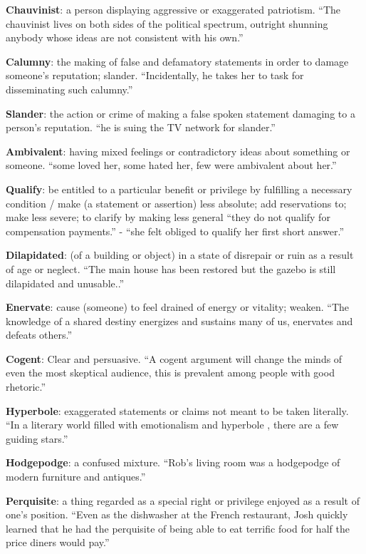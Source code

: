 \documentclass[12pt, a4paper]{ximera}
\begin{document}
\textbf{Chauvinist}: a person displaying aggressive or exaggerated patriotism. ``The chauvinist lives on both sides of the political spectrum, outright shunning anybody whose ideas are not consistent with his own.''

\textbf{Calumny}: the making of false and defamatory statements in order to damage someone's reputation; slander. ``Incidentally, he takes her to task for disseminating such calumny.''

\textbf{Slander}: the action or crime of making a false spoken statement damaging to a person's reputation. ``he is suing the TV network for slander.''

\textbf{Ambivalent}: having mixed feelings or contradictory ideas about something or someone. ``some loved her, some hated her, few were ambivalent about her.''

\textbf{Qualify}: be entitled to a particular benefit or privilege by fulfilling a necessary condition / make (a statement or assertion) less absolute; add reservations to; make less severe; to clarify by making less general ``they do not qualify for compensation payments.'' - ``she felt obliged to qualify her first short answer.''

\textbf{Dilapidated}: (of a building or object) in a state of disrepair or ruin as a result of age or neglect. ``The main house has been restored but the gazebo is still dilapidated and unusable..''

\textbf{Enervate}: cause (someone) to feel drained of energy or vitality; weaken.  ``The knowledge of a shared destiny energizes and sustains many of us, enervates and defeats others.''

\textbf{Cogent}: Clear and persuasive. ``A cogent argument will change the minds of even the most skeptical audience, this is prevalent among people with good rhetoric.''

\textbf{Hyperbole}: exaggerated statements or claims not meant to be taken literally. ``In a literary world filled with emotionalism and hyperbole , there are a few guiding stars.''

\textbf{Hodgepodge}: a confused mixture. ``Rob's living room was a hodgepodge of modern furniture and antiques.''

\textbf{Perquisite}: a thing regarded as a special right or privilege enjoyed as a result of one's position. ``Even as the dishwasher at the French restaurant, Josh quickly learned that he had the perquisite of being able to eat terrific food for half the price diners would pay.''
\end{document}
